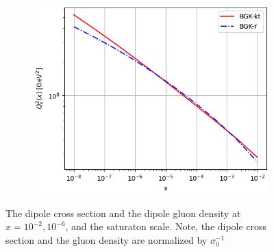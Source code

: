 \documentclass[11pt]{article}
\numberwithin{equation}{section}
\numberwithin{table}{section}
\numberwithin{figure}{section}
\begin{document}
\begin{figure}[t]
\begin{subfigure}{0.32\textwidth}
\includegraphics[width=\textwidth]{./plots/BGK-saturation.png}
\end{subfigure}
\caption{The dipole cross section and the dipole gluon density at
$x=10^{-2}, 10^{-6}$, and the saturaton scale. 
Note, the dipole cross section and the gluon density are normalized by $\sigma_0^{-1}$}
\label{fig:BGK}
\end{figure}
\end{document}
